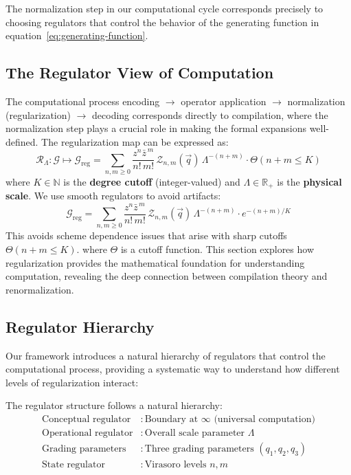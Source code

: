 The normalization step in our computational cycle corresponds precisely to choosing regulators that control the behavior of the generating function in equation~\eqref{eq:generating-function}.

\subsection{The Regulator View of Computation}

The computational process encoding $\to$ operator application $\to$ normalization (regularization) $\to$ decoding corresponds directly to compilation, where the normalization step plays a crucial role in making the formal expansions well-defined. The regularization map can be expressed as:
\[
\mathcal{R}_\Lambda: \mathcal{G} \mapsto \mathcal{G}_{\text{reg}} = \sum_{n,m\ge0}\frac{z^n\bar{z}^{\,m}}{n!\,m!}\,\mathcal{Z}_{n,m}(\vec{q})\,\Lambda^{-(n+m)} \cdot \Theta(n+m \leq K)
\]
where $K \in \mathbb{N}$ is the \textbf{degree cutoff} (integer-valued) and $\Lambda \in \mathbb{R}_+$ is the \textbf{physical scale}. We use smooth regulators to avoid artifacts:
\[
\mathcal{G}_{\text{reg}} = \sum_{n,m\ge0}\frac{z^n\bar{z}^{\,m}}{n!\,m!}\,\mathcal{Z}_{n,m}(\vec{q})\,\Lambda^{-(n+m)} \cdot e^{-(n+m)/K}
\]
This avoids scheme dependence issues that arise with sharp cutoffs $\Theta(n+m \leq K)$.
where $\Theta$ is a cutoff function. This section explores how regularization provides the mathematical foundation for understanding computation, revealing the deep connection between compilation theory and renormalization.

\subsection{Regulator Hierarchy}

Our framework introduces a natural hierarchy of regulators that control the computational process, providing a systematic way to understand how different levels of regularization interact:

\begin{definition}
\label{def:regulator-hierarchy}
The regulator structure follows a natural hierarchy:
\begin{align}
\text{Conceptual regulator} &: \text{Boundary at } \infty \text{ (universal computation)} \\
\text{Operational regulator} &: \text{Overall scale parameter } \Lambda \\
\text{Grading parameters} &: \text{Three grading parameters } (q_1, q_2, q_3) \\
\text{State regulator} &: \text{Virasoro levels } n, m
\end{align}
\end{definition}

